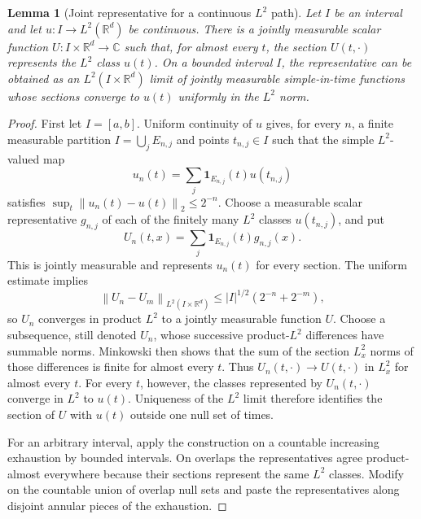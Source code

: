 \documentclass[11pt,oneside]{book}
\newtheorem{lemma}[theorem]{Lemma}
\theoremstyle{definition}
\theoremstyle{remark}
\newcommand{\R}{\mathbb R}
\newcommand{\C}{\mathbb C}
\newcommand{\1}{\mathbf 1}
\newcommand{\norm}[1]{\left\lVert #1\right\rVert}
\begin{document}
\begin{lemma}[Joint representative for a continuous $L^2$ path]
\label{lem:joint-representative-L2}
Let $I$ be an interval and let $u:I\to L^2(\R^d)$ be continuous.  There is a
jointly measurable scalar function $U:I\times\R^d\to\C$ such that, for almost
every $t$, the section $U(t,\cdot)$ represents the $L^2$ class $u(t)$.  On a
bounded interval $I$, the representative can be obtained as an
$L^2(I\times\R^d)$ limit of jointly measurable simple-in-time functions whose
sections converge to $u(t)$ uniformly in the $L^2$ norm.
\end{lemma}

\begin{proof}
First let $I=[a,b]$.  Uniform continuity of $u$ gives, for every $n$, a
finite measurable partition $I=\bigcup_jE_{n,j}$ and points $t_{n,j}\in I$
such that the simple $L^2$-valued map
\[
 u_n(t)=\sum_j\1_{E_{n,j}}(t)u(t_{n,j})
\]
satisfies $\sup_t\norm{u_n(t)-u(t)}_2\le2^{-n}$.  Choose a measurable scalar
representative $g_{n,j}$ of each of the finitely many $L^2$ classes
$u(t_{n,j})$, and put
\[
 U_n(t,x)=\sum_j\1_{E_{n,j}}(t)g_{n,j}(x).
\]
This is jointly measurable and represents $u_n(t)$ for every section.  The
uniform estimate implies
\[
 \norm{U_n-U_m}_{L^2(I\times\R^d)}
 \le |I|^{1/2}(2^{-n}+2^{-m}),
\]
so $U_n$ converges in product $L^2$ to a jointly measurable function $U$.
Choose a subsequence, still denoted $U_n$, whose successive product-$L^2$
differences have summable norms.  Minkowski then shows that the sum of the
section $L^2_x$ norms of those differences is finite for almost every $t$.
Thus $U_n(t,\cdot)\to U(t,\cdot)$ in $L^2_x$ for almost every $t$.  For every
$t$, however, the classes represented by $U_n(t,\cdot)$ converge in $L^2$ to
$u(t)$.  Uniqueness of the $L^2$ limit therefore identifies the section of
$U$ with $u(t)$ outside one null set of times.

For an arbitrary interval, apply the construction on a countable increasing
exhaustion by bounded intervals.  On overlaps the representatives agree
product-almost everywhere because their sections represent the same $L^2$
classes.  Modify on the countable union of overlap null sets and paste the
representatives along disjoint annular pieces of the exhaustion.
\end{proof}
\end{document}

